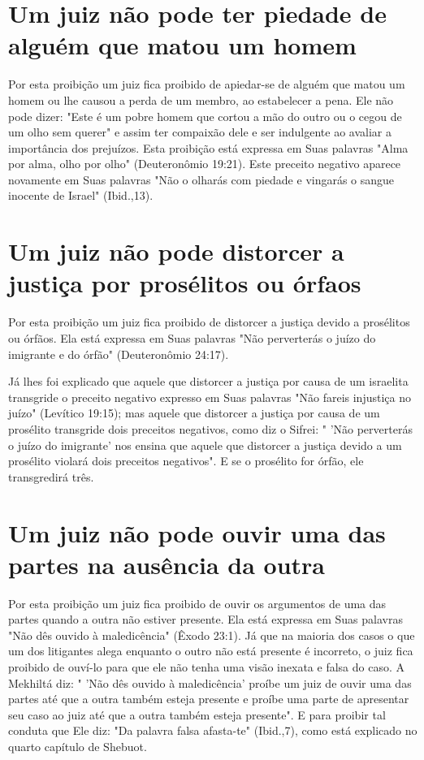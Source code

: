 \begin{itemize}
\begin{enumrate}
\begin{itemize}
\begin{itemize}
\begin{itemize}
\section{Um juiz não pode ter piedade de alguém que matou um homem}

Por esta proibição um juiz fica proibido de apiedar-se de alguém que
matou um homem ou lhe causou a perda de um membro, ao estabelecer a
pe­na. Ele não pode dizer: "Este é um pobre homem que cortou a mão do
outro ou o cegou de um olho sem querer" e assim ter compaixão dele e ser
indulgen­te ao avaliar a importância dos prejuízos. Esta proibição está
expressa em Suas palavras "Alma por alma, olho por olho" (Deuteronômio
19:21). Este preceito negativo aparece novamente em Suas palavras "Não o
olharás com piedade e vingarás o sangue inocente de Israel" (Ibid.,13).

\section{Um juiz não pode distorcer a justiça por prosélitos ou órfaos}

Por esta proibição um juiz fica proibido de distorcer a justiça devi­do
a prosélitos ou órfãos. Ela está expressa em Suas palavras "Não
perverterás o juízo do imigrante e do órfão" (Deuteronômio 24:17).

Já lhes foi explicado que aquele que distorcer a justiça por causa de um
israelita transgride o preceito negativo expresso em Suas palavras "Não
fa­reis injustiça no juízo" (Levítico 19:15); mas aquele que distorcer a
justiça por causa de um prosélito transgride dois preceitos negativos,
como diz o Sifrei: " 'Não perverterás o juízo do imigrante' nos ensina
que aquele que distorcer a justiça devido a um prosélito violará dois
preceitos negativos". E se o proséli­to for órfão, ele transgredirá
três.

\section{Um juiz não pode ouvir uma das partes na ausência da outra}

Por esta proibição um juiz fica proibido de ouvir os argumentos de uma
das partes quando a outra não estiver presente. Ela está expressa em
Suas palavras "Não dês ouvido à maledicência" (Êxodo 23:1). Já que na
maioria dos casos o que um dos litigantes alega enquanto o outro não
está presente é incor­reto, o juiz fica proibido de ouví-lo para que ele
não tenha uma visão inexata e falsa do caso. A Mekhiltá diz: " 'Não dês
ouvido à maledicência' proíbe um juiz de ouvir uma das partes até que a
outra também esteja presente e proíbe uma parte de apresentar seu caso
ao juiz até que a outra também esteja presen­te". E para proibir tal
conduta que Ele diz: "Da palavra falsa afasta-te" (Ibid.,7), como está
explicado no quarto capítulo de Shebuot.


\end{itemize}
\end{itemize}
\end{itemize}
\end{enumrate}
\end{itemize}
